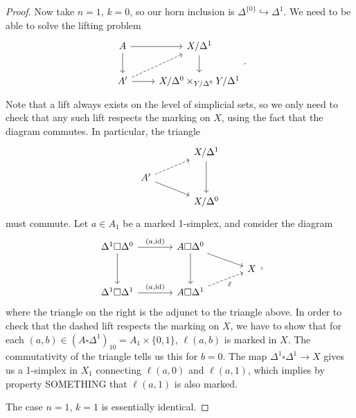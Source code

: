 \documentclass[main.tex]{subfiles}
\begin{document}
\begin{proof}
  Now take $n = 1$, $k = 0$, so our horn inclusion is $\Delta^{\{0\}} \hookrightarrow \Delta^{1}$. We need to be able to solve the lifting problem
  \begin{equation*}
    \begin{tikzcd}
      A
      \arrow[r]
      \arrow[d]
      & X / \Delta^{1}
      \arrow[d]
      \\
      A'
      \arrow[r]
      \arrow[ur, dashed]
      & X / \Delta^{0} \times_{Y / \Delta^{0}} Y / \Delta^{1}
    \end{tikzcd}.
  \end{equation*}
  Note that a lift always exists on the level of simplicial sets, so we only need to check that any such lift respects the marking on $X$, using the fact that the diagram commutes. In particular, the triangle
  \begin{equation*}
    \begin{tikzcd}[row sep=small, column sep=large]
      & X / \Delta^{1}
      \arrow[dd]
      \\
      A'
      \arrow[ur, dashed]
      \arrow[dr]
      \\
      & X / \Delta^{0}
    \end{tikzcd}
  \end{equation*}
  must commute. Let $a \in A_{1}$ be a marked 1-simplex, and consider the diagram
  \begin{equation*}
    \begin{tikzcd}[row sep=small, column sep=large]
      \Delta^{1} \square \Delta^{0}
      \arrow[r, "{(a, \id)}"]
      \arrow[dd]
      & A \square \Delta^{0}
      \arrow[dd]
      \arrow[dr]
      \\
      && X
      \\
      \Delta^{1} \square \Delta^{1}
      \arrow[r, "{(a, \id)}"]
      & A \square \Delta^{1}
      \arrow[ur, dashed, swap, "\ell"]
    \end{tikzcd},
  \end{equation*}
  where the triangle on the right is the adjunct to the triangle above. In order to check that the dashed lift respects the marking on $X$, we have to show that for each $(a, b) \in (A \square \Delta^{1})_{10} = A_{1} \times \{0, 1\}$, $\ell(a, b)$ is marked in $X$. The commutativity of the triangle tells us this for $b = 0$. The map $\Delta^{1} \square \Delta^{1} \to X$ gives us a 1-simplex in $X_{1}$ connecting $\ell(a, 0)$ and $\ell(a, 1)$, which implies by property SOMETHING that $\ell(a, 1)$ is also marked.

  The case $n = 1$, $k = 1$ is essentially identical.
\end{proof}
\end{document}
